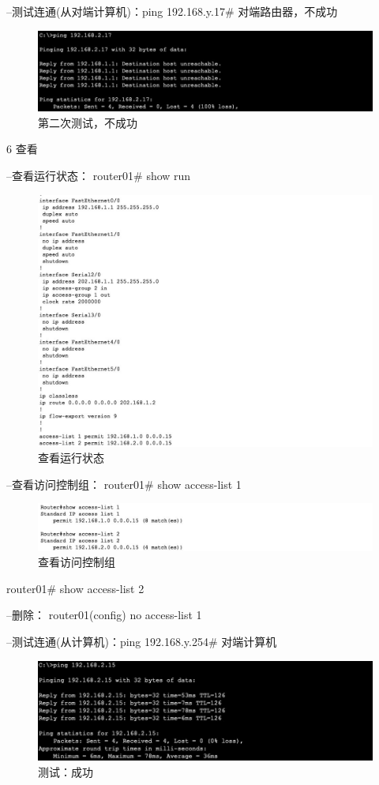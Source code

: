 \documentclass[lang=cn,11pt,a4paper,cite=authoryear]{elegantpaper}
\begin{document}
--测试连通(从对端计算机)：ping 192.168.y.17\# 对端路由器，不成功

\begin{figure}[htbp]
	\centering
	\includegraphics[width=0.7\linewidth]{image/screenshot042}
	\caption{第二次测试，不成功}
	\label{fig:screenshot042}
\end{figure}


6 查看

--查看运行状态： router01\# show run

\begin{figure}[htbp]
	\centering
	\includegraphics[width=0.7\linewidth]{image/screenshot043}
	\caption{查看运行状态}
	\label{fig:screenshot043}
\end{figure}

--查看访问控制组： router01\# show access-list 1

\begin{figure}[htbp]
	\centering
	\includegraphics[width=0.7\linewidth]{image/screenshot044}
	\caption{查看访问控制组}
	\label{fig:screenshot044}
\end{figure}


router01\# show access-list 2

--删除： router01(config) no access-list 1

--测试连通(从计算机)：ping 192.168.y.254\# 对端计算机

\begin{figure}[htbp]
	\centering
	\includegraphics[width=0.7\linewidth]{image/screenshot045}
	\caption{测试：成功}
	\label{fig:screenshot045}
\end{figure}
\end{document}
